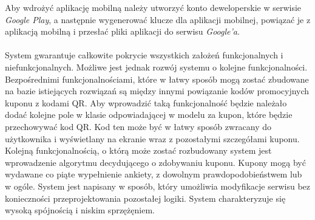 Aby wdrożyć aplikację mobilną należy utworzyć konto deweloperskie w serwisie \textit{Google Play}, a następnie wygenerować klucze dla aplikacji mobilnej, powiązać je z aplikacją mobilną i przesłać pliki aplikacji do serwisu \textit{Google'a}.

\paragraph{}
System gwarantuje całkowite pokrycie wszystkich założeń funkcjonalnych i niefunkcjonalnych. Możliwe jest jednak rozwój systemu o kolejne funkcjonalności. Bezpośrednimi funkcjonalnościami, które w łatwy sposób mogą zostać zbudowane na bazie istiejących rozwiązań są między innymi powiązanie kodów promocyjnych kuponu z kodami QR. Aby wprowadzić taką funkcjonalność będzie należało dodać kolejne pole w klasie odpowiadającej w modelu za kupon, które będzie przechowywać kod QR. Kod ten może być w łatwy sposób zwracany do użytkownika i wyświetlany na ekranie wraz z pozostałymi szczegółami kuponu. Kolejną funkcjonalnością, o którą może zostać rozbudowany system jest wprowadzenie algorytmu decydującego o zdobywaniu kuponu. Kupony mogą być wydawane co piąte wypełnienie ankiety, z dowolnym prawdopodobieństwem lub w ogóle. System jest napisany w sposób, który umożliwia modyfikacje serwisu bez konieczności przeprojektowania pozostałej logiki. System charakteryzuje się wysoką spójnością i niskim sprzężęniem.